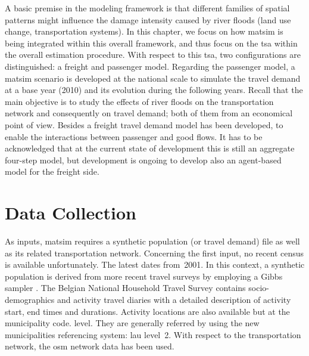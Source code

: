 A basic premise in the modeling framework is that different families of spatial patterns might influence the damage intensity caused by river floods (\eg land use change, transportation systems). 
In this chapter, we focus on how \gls{matsim} is being integrated within this overall framework, and thus focus on the \gls{tsa} within the overall estimation procedure. With respect to this \gls{tsa}, two configurations are distinguished: a freight and passenger model. 
Regarding the passenger model, a \gls{matsim} scenario is developed at the national scale to simulate the travel demand at a base year (2010) and its evolution during the following years. 
Recall that the main objective is to study the effects of river floods on the transportation network and consequently on travel demand; both of them from an economical point of view. 
Besides a freight travel demand model has been developed, to enable the interactions between passenger and good flows. 
It has to be acknowledged that at the current state of development this is still an aggregate four-step model, but development is ongoing to develop also an agent-based model for the freight side.  

\section{Data Collection}
As inputs, \gls{matsim} requires a synthetic population (or travel demand) file as well as its related transportation network. 
Concerning the first input, no recent census is available unfortunately. 
The latest dates from~2001. 
In this context, a synthetic population is derived from more recent travel surveys \citep[e.g.,][]{CornelisEtAl_ResRep_BELDAM_2012} by employing a Gibbs sampler \citep[][]{FarooqBierlaireHurtubiaEtAl2013Simulationbasedpopulation}. 
The Belgian National Household Travel Survey \citep[e.g.,][]{CornelisEtAl_ResRep_BELDAM_2012} contains socio-demographics and activity travel diaries with a detailed description of activity start, end times and durations. 
Activity locations are also available but at the municipality code. level. They are generally referred by using the new municipalities referencing system: \gls{lau} level~2. 
With respect to the transportation network, the \gls{osm} network data has been used.

